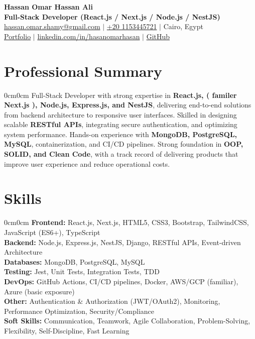 \documentclass[10pt, letterpaper]{article}
\newenvironment{onecolentry}{\begin{adjustwidth}{0cm}{0cm}}{\end{adjustwidth}}
\begin{document}
\begin{center}
    {\fontsize{20pt}{20pt}\selectfont \textbf{Hassan Omar Hassan Ali}} \\[6pt]
    \textbf{Full-Stack Developer (React.js / Next.js / Node.js / NestJS)} \\[4pt]
    \href{mailto:hassan.omar.shamy@gmail.com}{hassan.omar.shamy@gmail.com} $|$ 
    \href{tel:+201153445721}{+20 1153445721} $|$ 
    Cairo, Egypt \\[4pt]
    \href{https://portfilo-orpin-phi.vercel.app}{Portfolio} $|$ 
    \href{https://linkedin.com/in/hasanomarhasan}{linkedin.com/in/hasanomarhasan} $|$ 
    \href{https://github.com/HasanOmarHasan}{GitHub}
\end{center}

\vspace{6pt}

\section{Professional Summary}
\begin{onecolentry}
Full-Stack Developer with strong expertise in \textbf{React.js, ( familer Next.js ), Node.js, Express.js, and NestJS}, delivering end-to-end solutions from backend architecture to responsive user interfaces. Skilled in designing scalable \textbf{RESTful APIs}, integrating secure authentication, and optimizing system performance. Hands-on experience with \textbf{MongoDB, PostgreSQL, MySQL}, containerization, and CI/CD pipelines. Strong foundation in \textbf{OOP, SOLID, and Clean Code}, with a track record of delivering products that improve user experience and reduce operational costs.
\end{onecolentry}

\section{Skills}
\begin{onecolentry}
\textbf{Frontend:} React.js, Next.js, HTML5, CSS3, Bootstrap, TailwindCSS, JavaScript (ES6+), TypeScript \\
\textbf{Backend:} Node.js, Express.js, NestJS, Django, RESTful APIs, Event-driven Architecture \\
\textbf{Databases:} MongoDB, PostgreSQL, MySQL \\
\textbf{Testing:} Jest, Unit Tests, Integration Tests, TDD \\
\textbf{DevOps:} GitHub Actions, CI/CD pipelines, Docker, AWS/GCP (familiar), Azure (basic exposure) \\
\textbf{Other:} Authentication \& Authorization (JWT/OAuth2), Monitoring, Performance Optimization, Security/Compliance \\
\textbf{Soft Skills:} Communication, Teamwork, Agile Collaboration, Problem-Solving, Flexibility, Self-Discipline, Fast Learning
\end{onecolentry}
\end{document}
